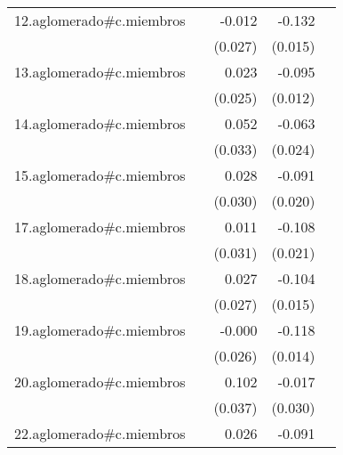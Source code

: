 {\begin{longtable}{l*{4}{D{.}{.}{-1}}}
\addlinespace
12.aglomerado#c.miembros&                     &      -0.012         &      -0.132\sym{***}&                     \\
            &                     &     (0.027)         &     (0.015)         &                     \\
\addlinespace
13.aglomerado#c.miembros&                     &       0.023         &      -0.095\sym{***}&                     \\
            &                     &     (0.025)         &     (0.012)         &                     \\
\addlinespace
14.aglomerado#c.miembros&                     &       0.052         &      -0.063\sym{**} &                     \\
            &                     &     (0.033)         &     (0.024)         &                     \\
\addlinespace
15.aglomerado#c.miembros&                     &       0.028         &      -0.091\sym{***}&                     \\
            &                     &     (0.030)         &     (0.020)         &                     \\
\addlinespace
17.aglomerado#c.miembros&                     &       0.011         &      -0.108\sym{***}&                     \\
            &                     &     (0.031)         &     (0.021)         &                     \\
\addlinespace
18.aglomerado#c.miembros&                     &       0.027         &      -0.104\sym{***}&                     \\
            &                     &     (0.027)         &     (0.015)         &                     \\
\addlinespace
19.aglomerado#c.miembros&                     &      -0.000         &      -0.118\sym{***}&                     \\
            &                     &     (0.026)         &     (0.014)         &                     \\
\addlinespace
20.aglomerado#c.miembros&                     &       0.102\sym{**} &      -0.017         &                     \\
            &                     &     (0.037)         &     (0.030)         &                     \\
\addlinespace
22.aglomerado#c.miembros&                     &       0.026         &      -0.091\sym{***}&                     \\

\end{longtable}}
